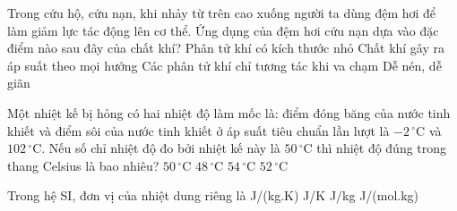 	\begin{ex}%
		Trong cứu hộ, cứu nạn, khi nhảy từ trên cao xuống người ta dùng đệm hơi để làm giảm lực tác động lên cơ thể. Ứng dụng của đệm hơi cứu nạn dựa vào đặc điểm nào sau đây của chất khí?
		\choice
		{Phân tử khí có kích thước nhỏ}
		{Chất khí gây ra áp suất theo mọi hướng}
		{Các phân tử khí chỉ tương tác khi va chạm}
		{\True Dễ nén, dễ giãn}
	\end{ex}

	\begin{ex}%
		Một nhiệt kế bị hỏng có hai nhiệt độ làm mốc là: điểm đóng băng của nước tinh khiết và điểm sôi của nước tinh khiết ở áp suất tiêu chuẩn lần lượt là $-2\,^\circ\text{C}$ và $102\,^\circ\text{C}$. Nếu số chỉ nhiệt độ đo bởi nhiệt kế này là $50\,^\circ\text{C}$ thì nhiệt độ đúng trong thang Celsius là bao nhiêu?
		\choice
		{\True $50\,^\circ\text{C}$}
		{$48\,^\circ\text{C}$}
		{$54\,^\circ\text{C}$}
		{$52\,^\circ\text{C}$}
	\end{ex}

	\begin{ex}%
		Trong hệ SI, đơn vị của nhiệt dung riêng là
		\choice
		{\True J/(kg.K)}
		{J/K}
		{J/kg}
		{J/(mol.kg)}
	\end{ex}

